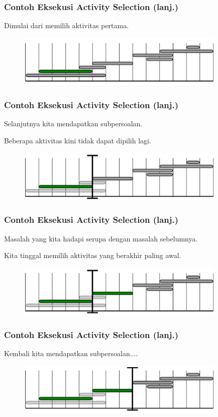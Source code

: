 \begin{frame}
  \frametitle{Contoh Eksekusi Activity Selection (lanj.)}
  Dimulai dari memilih aktivitas pertama.
  \begin{figure}
    \includegraphics[width=10cm]{asset/activity-selection-algo-2.pdf}
  \end{figure}
\end{frame}

\begin{frame}
  \frametitle{Contoh Eksekusi Activity Selection (lanj.)}
  Selanjutnya kita mendapatkan subpersoalan.

  Beberapa aktivitas kini tidak dapat dipilih lagi.
  \begin{figure}
    \includegraphics[width=10cm]{asset/activity-selection-algo-3.pdf}
  \end{figure}
\end{frame}

\begin{frame}
  \frametitle{Contoh Eksekusi Activity Selection (lanj.)}
  Masalah yang kita hadapi serupa dengan masalah sebelumnya.

  Kita tinggal memilih aktivitas yang berakhir paling awal.
  \begin{figure}
    \includegraphics[width=10cm]{asset/activity-selection-algo-4.pdf}
  \end{figure}
\end{frame}

\begin{frame}
  \frametitle{Contoh Eksekusi Activity Selection (lanj.)}
  Kembali kita mendapatkan subpersoalan....
  \begin{figure}
    \includegraphics[width=10cm]{asset/activity-selection-algo-5.pdf}
  \end{figure}
\end{frame}

